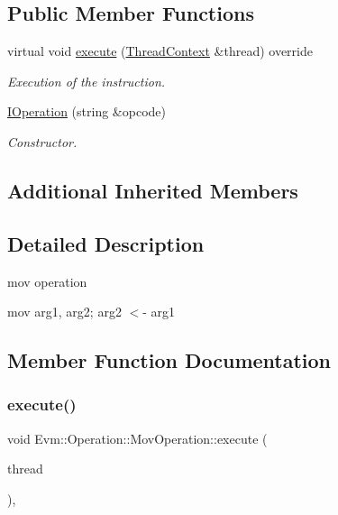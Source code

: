 \subsection*{Public Member Functions}
\begin{DoxyCompactItemize}
\item 
virtual void \mbox{\hyperlink{struct_evm_1_1_operation_1_1_mov_operation_ab14344cf9597038ad5e2dda9d1846136}{execute}} (\mbox{\hyperlink{struct_evm_1_1_thread_context}{Thread\+Context}} \&thread) override
\begin{DoxyCompactList}\small\item\em Execution of the instruction. \end{DoxyCompactList}\item 
\mbox{\hyperlink{struct_evm_1_1_operation_1_1_mov_operation_a65e98ee1b1679e12c1d1dd000ebfe937}{I\+Operation}} (string \&opcode)
\begin{DoxyCompactList}\small\item\em Constructor. \end{DoxyCompactList}\end{DoxyCompactItemize}
\subsection*{Additional Inherited Members}


\subsection{Detailed Description}
mov operation 

mov arg1, arg2; arg2 $<$-\/ arg1 

\subsection{Member Function Documentation}
\mbox{\label{struct_evm_1_1_operation_1_1_mov_operation_ab14344cf9597038ad5e2dda9d1846136}} 
\subsubsection{\texorpdfstring{execute()}{execute()}}
{\footnotesize\ttfamily void Evm\+::\+Operation\+::\+Mov\+Operation\+::execute (\begin{DoxyParamCaption}\item[{\mbox{\hyperlink{struct_evm_1_1_thread_context}{Thread\+Context}} \&}]{thread }\end{DoxyParamCaption})\hspace{0.3cm}{\ttfamily [override]}, {\ttfamily [virtual]}}



